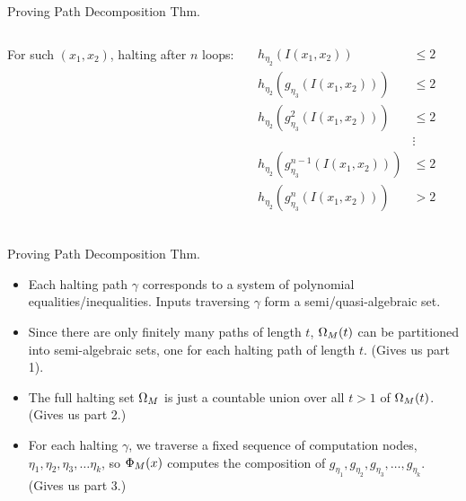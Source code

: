 \documentclass[c]{beamer}
\begin{document}
\begin{frame}{Proving Path Decomposition Thm.}

    \begin{columns}
      
      For such $(x_1, x_2)$, halting after $n$ loops:

      \begin{align*}
        h_{\eta_2}(I(x_1, x_2)) &\leq 2 \\
        h_{\eta_2}(g_{\eta_3}(I(x_1, x_2))) &\leq 2 \\
        h_{\eta_2}(g^2_{\eta_3}(I(x_1, x_2))) &\leq 2 \\
        &\vdots\\
        h_{\eta_2}(g^{n-1}_{\eta_3}(I(x_1, x_2))) &\leq 2 \\
        h_{\eta_2}(g^{n}_{\eta_3}(I(x_1, x_2))) &> 2 \\
      \end{align*}
      
      \scaletopagewidth[.9]{\mandelrecfull{}}
    \end{columns}    
\end{frame}

\begin{frame}{Proving Path Decomposition Thm.}

  \begin{itemize}
  \item[] Each halting path $\gamma$ corresponds to a system of
    polynomial equalities/inequalities. Inputs traversing $\gamma$
    form a semi/quasi-algebraic set.\pause

    \vspace{\baselineskip}

  \item[] Since there are only finitely many paths of length $t$,
    $\Omega_M(t)$ can be partitioned into semi-algebraic sets, one
    for each halting path of length $t$. (Gives us part 1).\pause

    \vspace{\baselineskip}

  \item[] The full halting set $\Omega_M$ is just a countable union
    over all $t > 1$ of $\Omega_M(t)$. (Gives us part 2.)\pause

    \vspace{\baselineskip}

  \item[] For each halting $\gamma$, we traverse a fixed sequence of
    computation nodes, $\eta_1, \eta_2, \eta_3, \ldots \eta_k$, so
    $\Phi_M(x)$ computes the composition of $g_{\eta_1},
    g_{\eta_2}, g_{\eta_3}, \ldots, g_{\eta_k}$. (Gives us part 3.)
  \end{itemize}
\end{frame}
\end{document}
